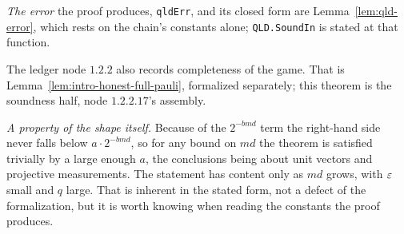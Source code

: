 \emph{The error} the proof produces, \texttt{qldErr}, and its closed form are
Lemma~\ref{lem:qld-error}, which rests on the chain's constants alone; \texttt{QLD.SoundIn} is
stated at that function.

The ledger node $1.2.2$ also records completeness of the game. That is
Lemma~\ref{lem:intro-honest-full-pauli}, formalized separately; this theorem is the soundness
half, node $1.2.2.17$'s assembly.

\emph{A property of the shape itself.} Because of the $2^{-bmd}$ term the right-hand side never
falls below $a \cdot 2^{-bmd}$, so for any bound on $md$ the theorem is satisfied trivially by a
large enough $a$, the conclusions being about unit vectors and projective measurements. The
statement has content only as $md$ grows, with $\varepsilon$ small and $q$ large. That is inherent in
the stated form, not a defect of the formalization, but it is worth knowing when reading the
constants the proof produces.



